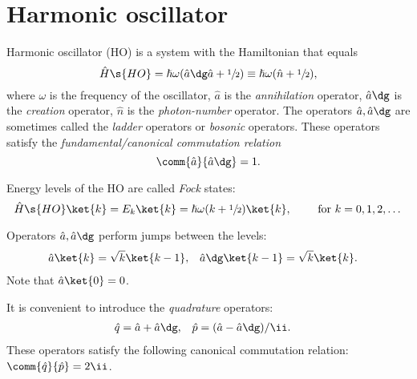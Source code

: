 \documentclass[fontsize=9pt,bookmarkpackage=false]{scrartcl}
\renewcommand{\hbar}{\hslash}
\begin{document}


\cleardoublepage

\appendix
\appendixpage
\addappheadtotoc

\section{Harmonic oscillator} %
\label{sec:harmonic_oscillator}

Harmonic oscillator (HO) is a system with the Hamiltonian that equals
\begin{equation}
  \hat H\s{HO} = \hbar \omega ( \hat a\dg \hat a +  \sfrac 12 ) \equiv \hbar \omega ( \hat n + \sfrac 12 ),
\end{equation}
where $\omega$ is the frequency of the oscillator, $\hat a$ is the \emph{annihilation} operator, $\hat a\dg$ is the \emph{creation} operator, $\hat n$ is the \emph{photon-number} operator.
The operators $\hat a, \hat a\dg$ are sometimes called the \emph{ladder} operators or \emph{bosonic} operators.
These operators satisfy the \emph{fundamental/canonical commutation relation}
\begin{equation}
  \comm{ \hat a }{ \hat a \dg } = 1.
\end{equation}

Energy levels of the HO are called \emph{Fock} states:
\begin{equation}
  \hat H\s{HO} \ket{ k } = E_k \ket{ k } = \hbar \omega ( k + \sfrac 12 ) \ket{ k },
  \qquad
  \text{ for }
  k = 0,1,2,\dots
\end{equation}

Operators $\hat a, \hat a\dg$ perform jumps between the levels:
\begin{align}
  \hat a \ket{ k }        & = \sqrt{ k } \ket{ k - 1 }, &
  \hat a\dg \ket{ k - 1 } & = \sqrt{ k } \ket {k }.
\end{align}
Note that $\hat a \ket{0} = 0$.

It is convenient to introduce the \emph{quadrature} operators:
\begin{align}
  \hat q & = \hat a + \hat a\dg, &
  \hat p & = ( \hat a - \hat a\dg ) / \ii.
\end{align}
These operators satisfy the following canonical commutation relation: $\comm{ \hat q }{ \hat p } = 2 \ii$.
\end{document}
